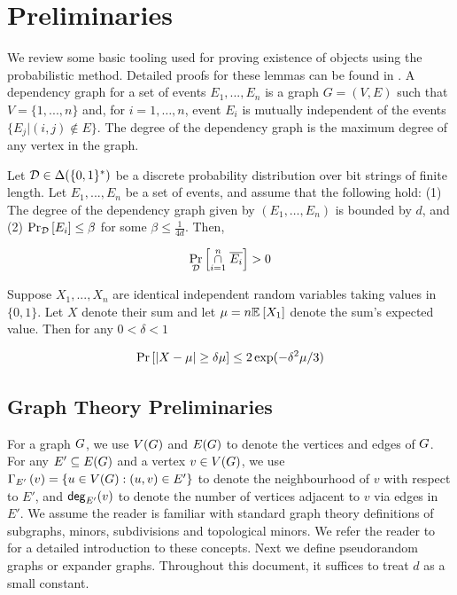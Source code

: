 \documentclass[11pt]{article}
\begin{document}
\section{Preliminaries}
\label{sec:prelims}

We review some basic tooling used for proving existence of objects using the probabilistic method.
Detailed proofs for these lemmas can be found in \citep[Chapter 1, Chapter 7]{mitzenmacher2017probability}.
A dependency graph for a set of events $E_1, . . . , E_n$ is a graph $G=(V, E)$ such that $V = \{1,.. . , n\}$ and,  for $i= 1,\dots, n$, event $E_i$ is mutually independent
of the events $\{E_j | (i, j) \notin E\}$. The degree of the dependency graph is the maximum degree of any vertex in the graph.

\begin{lemma}\label{lemma:lll}Let $\mathcal{D} \in \Delta(\{0,1\}^*)$ be a discrete probability distribution over bit strings of finite length.
Let $E_1,...,E_n$ be a set of events, and assume that the following hold: (1) The degree of the dependency graph given by $(E_1, \dots, E_n)$ is bounded by $d$, and (2) $\Pr_{\mathcal{D}}\left[E_i \right] \leq \beta$ for some $\beta \leq \frac{1}{4d}$. Then,

\[ \Pr_{\mathcal{D}}\left[\overset{n}{ \underset{i=1}{\cap}} \hspace{0.1cm}  \overline{E_i} \right] > 0\]		
\end{lemma}

\begin{lemma}\label{lemma:mult-chernoff}
Suppose $X_1, ..., X_n$ are identical independent random variables taking values in $\{0, 1\}$. Let $X$ denote their sum and let $\mu = n\mathbb{E}_{}\left[X_1\right]$ denote the sum's expected value. Then for any $0 < \delta < 1$

\[ \Pr\left[|X - \mu| \geq \delta \mu \right] \leq 2\exp(-\delta^2\mu/3)\]
	
\end{lemma}



\subsection{Graph Theory Preliminaries}
\label{sec:graph-theory-prelims}

For a graph $G$, we use $V(G)$ and $E(G)$ to denote the vertices and edges of $G$. 
For any $E' \subseteq E(G)$ and a vertex $v \in V(G)$, we use $\Gamma_{E'}\left(v\right) = \{ u \in V(G) : (u,v) \in E' \}$ to denote the neighbourhood of $v$ with respect to $E'$, and $\mathsf{deg}_{E'}(v)$ to denote the number of vertices adjacent to $v$ via edges in $E'$.
We assume the reader is familiar with standard graph theory definitions of subgraphs, minors, subdivisions and  topological minors.
We refer the reader to \citep{bollobas2012graph} for a detailed introduction to these concepts.
Next we define pseudorandom graphs or expander graphs. 
Throughout this document, it suffices to treat $d$ as a small constant.
\end{document}
